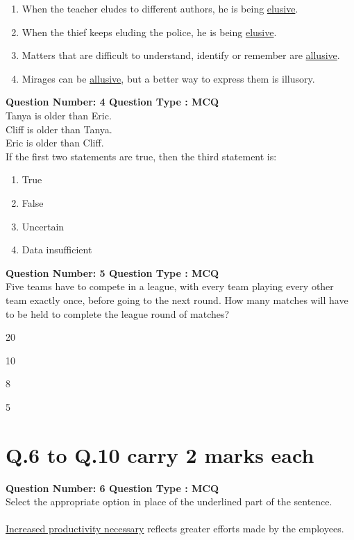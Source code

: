 \begin{enumerate}
    \item When the teacher eludes to different authors, he is being \underline{elusive}.
    \item When the thief keeps eluding the police, he is being \underline{elusive}.
    \item Matters that are difficult to understand, identify or remember are \underline{allusive}.
    \item Mirages can be \underline{allusive}, but a better way to express them is illusory.
\end{enumerate}
\bigskip
\item \textbf{Question Number: 4 Question Type : MCQ}\\
Tanya is older than Eric. \\
Cliff is older than Tanya. \\
Eric is older than Cliff. \\

 \setlength\parindent{24pt} If the first two statements are true, then the third statement is: \\

\begin{enumerate}
    \item True
    \item False
    \item Uncertain
    \item Data insufficient
\end{enumerate}
\bigskip
\item \textbf{Question Number: 5 Question Type : MCQ}\\
Five teams have to compete in a league, with every team playing every other team exactly once, before going to the next round. How many matches will have to be held to complete the league round of matches? \\

\begin{enumerate}
\begin{multicols}{4}
    \item 20
    \item 10
    \item 8
    \item 5
\end{multicols}
\end{enumerate}
\bigskip
\section*{Q.6 to Q.10 carry 2 marks each}
\item \textbf{Question Number: 6 Question Type : MCQ}\\
Select the appropriate option in place of the underlined part of the sentence. \\
\\
\underline{Increased productivity necessary} reflects greater efforts made by the employees. \\

